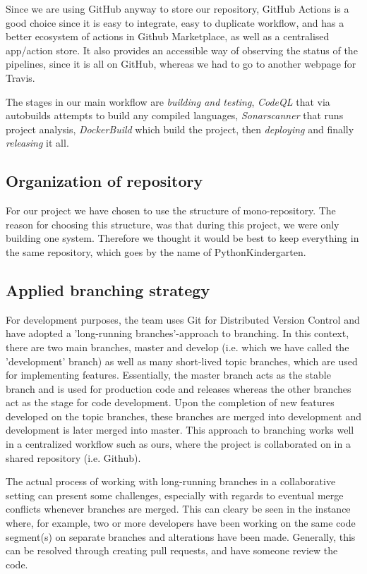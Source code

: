 Since we are using GitHub anyway to store our repository, GitHub Actions is a good choice since it is easy to 
integrate, easy to duplicate workflow, and has a better ecosystem of actions in Github Marketplace, as well as a centralised app/action store. 
It also provides an accessible way of observing the status of the pipelines, since it is all on GitHub, whereas we had to go to another webpage for Travis.  

The stages in our main workflow are \textit{building and testing}, \textit{CodeQL} that via autobuilds attempts to build any compiled languages, \textit{Sonarscanner} that runs project analysis, \textit{DockerBuild} which build the project, then \textit{deploying} and finally \textit{releasing} it all.\newline

\subsection{Organization of repository} %
For our project we have chosen to use the structure of mono-repository. 
The reason for choosing this structure, was that during this project, we were only building one system. 
Therefore we thought it would be best to keep everything in the same repository, which goes by the name of PythonKindergarten. \newline
  
  
\subsection{Applied branching strategy}
For development purposes, the team uses Git for Distributed Version Control and have adopted a 'long-running branches'-approach to branching. \cite{lecture02}
In this context, there are two main branches, master and develop (i.e. which we have called the 'development' branch) as well as many short-lived topic branches, 
which are used for implementing features. Essentially, the master branch acts as the stable branch and is used for production code and releases whereas the other branches act as the stage for code development. Upon the completion of new features developed on the topic branches, these branches are merged into development and development is later merged into master. This approach to branching works well in a centralized workflow such as ours, where the project is collaborated on in a shared repository (i.e. Github).

The actual process of working with long-running branches in a collaborative setting can present some challenges, especially with regards to eventual merge conflicts whenever branches are merged. 
This can cleary be seen in the instance where, for example, two or more developers have been working on the same code segment(s) on separate branches and alterations have been made. 
Generally, this can be resolved through creating pull requests, and have someone review the code.

